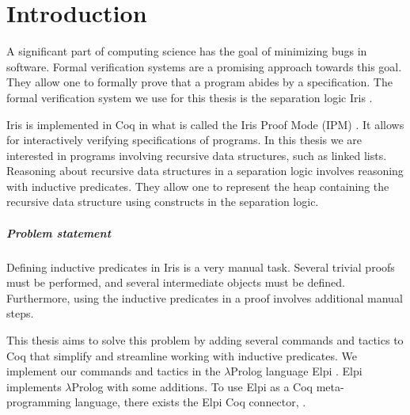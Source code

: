 \documentclass[thesis.tex]{subfiles}
\begin{document}
\chapter{Introduction}
\label{ch:introduction}


A significant part of computing science has the goal of minimizing bugs in software. Formal verification systems are a promising approach towards this goal. They allow one to formally prove that a program abides by a specification. The formal verification system we use for this thesis is the separation logic Iris \cite*{jungIrisMonoidsInvariants2015a,jungHigherorderGhostState2016,krebbersEssenceHigherOrderConcurrent2017,jungIrisGroundModular2018}.

Iris is implemented in Coq in what is called the Iris Proof Mode (IPM) \cite*{krebbersInteractiveProofsHigherorder2017,krebbersMoSeLGeneralExtensible2018}. It allows for interactively verifying specifications of programs. In this thesis we are interested in programs involving recursive data structures, such as linked lists. Reasoning about recursive data structures in a separation logic involves reasoning with inductive predicates. They allow one to represent the heap containing the recursive data structure using constructs in the separation logic.

\paragraph{Problem statement}
Defining inductive predicates in Iris is a very manual task. Several trivial proofs must be performed, and several intermediate objects must be defined. Furthermore, using the inductive predicates in a proof involves additional manual steps.

This thesis aims to solve this problem by adding several commands and tactics to Coq that simplify and streamline working with inductive predicates. We implement our commands and tactics in the $\lambda$Prolog language Elpi \cite{dunchevELPIFastEmbeddable2015,guidiImplementingTypeTheory2019}. Elpi implements $\lambda$Prolog \cite{millerHigherorderLogicProgramming1986,millerUniformProofsFoundation1991,belleanneePragmaticReconstructionLProlog1999,millerProgrammingHigherOrderLogic2012} with some additions. To use Elpi as a Coq meta-programming language, there exists the Elpi Coq connector, \ce \cite{tassiElpiExtensionLanguage2018}.
\end{document}
